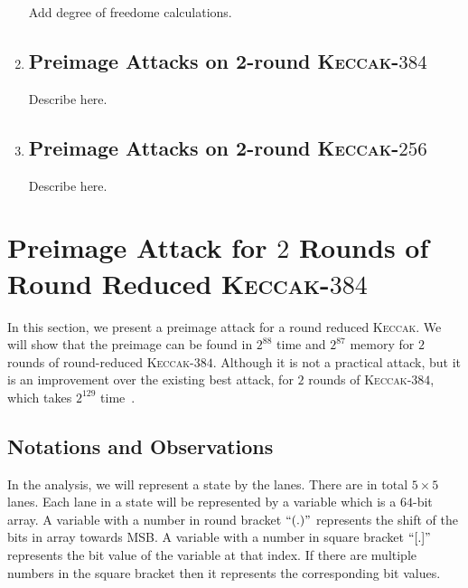 \documentclass[runningheads]{llncs}
\newcommand{\KECCAK}{\mbox{\textsc{Keccak}}}
\newcommand{\Keccak}{\mbox{\textsc{Keccak}}}
\begin{document}
\begin{enumerate}
		Add degree of freedome calculations.

	\item \subsection{Preimage Attacks on 2-round \KECCAK-$384$}
				Describe here.

	\item \subsection{Preimage Attacks on 2-round \KECCAK-$256$}
				Describe here.

\end{enumerate}

\section{Preimage Attack for $2$ Rounds of Round Reduced \KECCAK-$384$}

In this section, we present a preimage attack for a round reduced \KECCAK{}. We will show that the preimage can be found in $2^{88}$ time and $2^{87}$ memory for $2$ rounds of round-reduced \Keccak-$384$. Although it is not a practical attack, but it is an improvement over the existing best attack, for $2$ rounds of \Keccak-$384$, which takes $2^{129}$ time~\cite{guo2016linear}.


\subsection{Notations and Observations}
In the analysis, we will represent a state by the lanes. There are in total $5\times 5$ lanes. Each lane in a state will be represented by a
 variable which is a $64$-bit array. 
A variable with a number in round bracket $``( . )"$ represents the shift of the bits in array towards MSB. A variable with a number in square bracket $``[ . ]"$ represents the bit value of the variable at that index. If there are multiple numbers in the square bracket then it represents the corresponding bit values.

\end{document}
